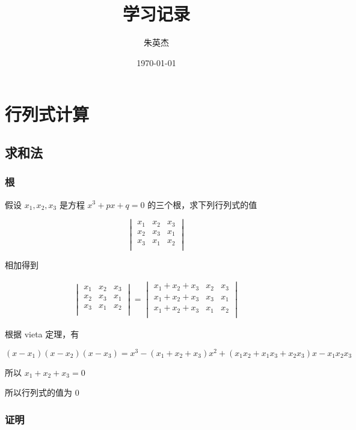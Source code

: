 \documentclass[12pt,a4paper]{ctexart}
\title{学习记录}
\author{朱英杰}
\date{\today}
\begin{document}
\maketitle
\tableofcontents


\section{行列式计算}

\subsection{求和法}

\subsubsection{根}

假设 $x_1, x_2, x_3$ 是方程 $x^3 + px + q = 0$ 的三个根，求下列行列式的值

\[
\begin{vmatrix}
    x_1 & x_2 & x_3\\
    x_2 & x_3 & x_1\\
    x_3 & x_1 & x_2\\
\end{vmatrix}
\]

相加得到

\begin{align*}
\begin{vmatrix}
    x_1 & x_2 & x_3\\
    x_2 & x_3 & x_1\\
    x_3 & x_1 & x_2\\
\end{vmatrix} = \begin{vmatrix}
    x_1 + x_2 + x_3 & x_2 & x_3\\
    x_1 + x_2 + x_3 & x_3 & x_1\\
    x_1 + x_2 + x_3 & x_1 & x_2\\
\end{vmatrix}
\end{align*}

根据 vieta 定理，有

\[
(x-x_1)(x-x_2)(x-x_3) = x^3 - (x_1 + x_2 + x_3)x^2 + (x_1x_2 + x_1x_3 + x_2x_3)x - x_1x_2x_3
\]

所以 $x_1 + x_2 + x_3 = 0$

所以行列式的值为 $0$

\subsubsection{证明}
\end{document}
